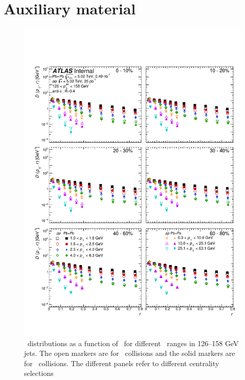 
\part*{Auxiliary material}



\begin{figure}[h]
\includegraphics[width=1.0\textwidth]{figures/results/DpT_dR_jet7.pdf}
\caption{ \Dptr\ distributions as a function of \rvar\ for different \pt\ ranges in 126--158 GeV jets. The open markers are for \pp\ collisions and the solid markers are for \pbpb\ collisions. The different panels refer to different centrality selections}
\label{fig:fullset_dptr_j7}
\end{figure}

